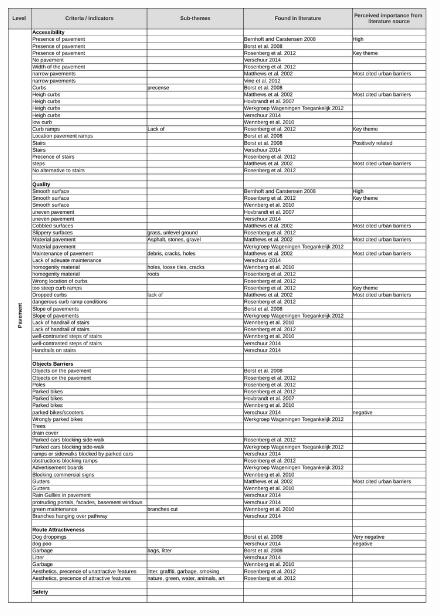 \begin{appendix}
\begin{figure}[h]
\includegraphics[width=\textwidth]{img/annex/A2_pavement_criteria.pdf}
\end{figure}
\begin{figure}[h]

\end{figure}
\end{appendix}
